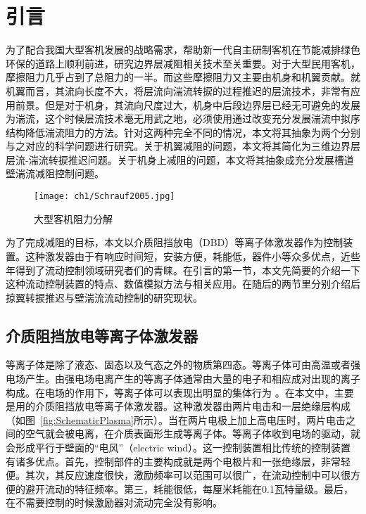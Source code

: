 \chapter{引言}
\label{cha:intro}

为了配合我国大型客机发展的战略需求，帮助新一代自主研制客机在节能减排绿色环保的道路上顺利前进，研究边界层减阻相关技术至关重要。对于大型民用客机，摩擦阻力几乎占到了总阻力的一半\cite{Schrauf2005}。而这些摩擦阻力又主要由机身和机翼贡献。就机翼而言，其流向长度不大，将层流向湍流转捩的过程推迟的层流技术，非常有应用前景\cite{Joslin1998}。但是对于机身，其流向尺度过大，机身中后段边界层已经无可避免的发展为湍流，这个时候层流技术毫无用武之地，必须使用通过改变充分发展湍流中拟序结构降低湍流阻力的方法。针对这两种完全不同的情况，本文将其抽象为两个分别与之对应的科学问题进行研究。关于机翼减阻的问题，本文将其简化为三维边界层层流-湍流转捩推迟问题。关于机身上减阻的问题，本文将其抽象成充分发展槽道壁湍流减阻控制问题。
\begin{figure}[htb]
  \centering
  \texttt{[image: ch1/Schrauf2005.jpg]}
  \caption{大型客机阻力分解\cite{Schrauf2005}}\label{f:Schrauf2005}
\end{figure}

为了完成减阻的目标，本文以介质阻挡放电（DBD）等离子体激发器作为控制装置。这种激发器由于有响应时间短，安装方便，耗能低，器件小等众多优点，近些年得到了流动控制领域研究者们的青睐。在引言的第一节，本文先简要的介绍一下这种流动控制装置的特点、数值模拟方法与相关应用。在随后的两节里分别介绍后掠翼转捩推迟与壁湍流流动控制的研究现状。


\section{介质阻挡放电等离子体激发器}

等离子体是除了液态、固态以及气态之外的物质第四态\cite{zhangguling2008,niewanshang2012}。等离子体可由高温或者强电场产生。由强电场电离产生的等离子体通常由大量的电子和相应成对出现的离子构成。在电场的作用下，等离子体可以表现出明显的集体行为
\cite{wuhong2015}。在本文中，主要是用的介质阻挡放电等离子体激发器。这种激发器由两片电击和一层绝缘层构成（如图~\ref{fig:SchematicPlasma}所示）。当在两片电极上加上高电压时，两片电击之间的空气就会被电离，在介质表面形生成等离子体。等离子体收到电场的驱动，就会形成平行于壁面的“电风”（electric wind）。这一控制装置相比传统的控制装置有诸多优点\cite{Corke2010}。首先，控制部件的主要构成就是两个电极片和一张绝缘层，非常轻便。其次，其反应速度很快，激励频率可以范围可以很广，在流动控制中可以很方便的避开流动的特征频率。第三，耗能很低，每厘米耗能在0.1瓦特量级。最后，在不需要控制的时候激励器对流动完全没有影响。

